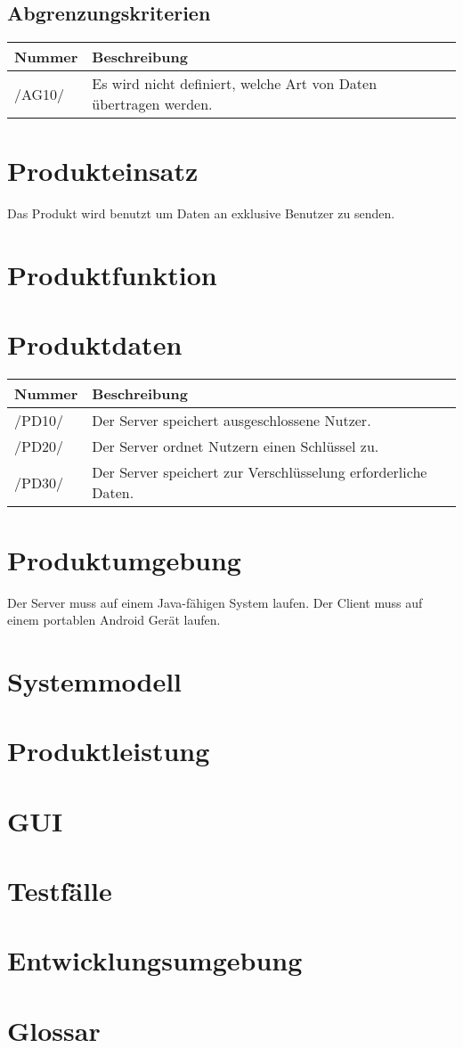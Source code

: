 \documentclass[a4paper,10pt]{article}
\newcommand\addrow[2]{#1 &#2\\ }
\newcommand\addheading[2]{#1 &#2\\ \hline}
\newcommand\tabularhead{\begin{tabular}{lp{13cm}}
\hline
}
\newenvironment{usecase}{\tabularhead}
{\hline\end{tabular}}
\begin{document}
\subsection{Abgrenzungskriterien}
\newcommand{\abgrenzungKuerzel}{AG}
\begin{usecase}
\addheading{Nummer}{Beschreibung}
\addrow{/\abgrenzungKuerzel10/} {Es wird nicht definiert, welche Art von Daten übertragen werden.}
\end{usecase}

\section{Produkteinsatz}
Das Produkt wird benutzt um Daten an exklusive Benutzer zu senden.

\section{Produktfunktion}

\section{Produktdaten}
\newcommand{\datenKuerzel}{PD}
\begin{usecase}
\addheading{Nummer}{Beschreibung}
\addrow{/\datenKuerzel10/} {Der Server speichert ausgeschlossene Nutzer.}
\addrow{/\datenKuerzel20/} {Der Server ordnet Nutzern einen Schlüssel zu.}
\addrow{/\datenKuerzel30/} {Der Server speichert zur Verschlüsselung erforderliche Daten.}
\end{usecase}

\section{Produktumgebung}
Der Server muss auf einem Java-fähigen System laufen.
Der Client muss auf einem portablen Android Gerät laufen.

\section{Systemmodell}

\section{Produktleistung}

\section{GUI}

\section{Testfälle}

\section{Entwicklungsumgebung}

\section{Glossar}


\clearpage

\end{document}
